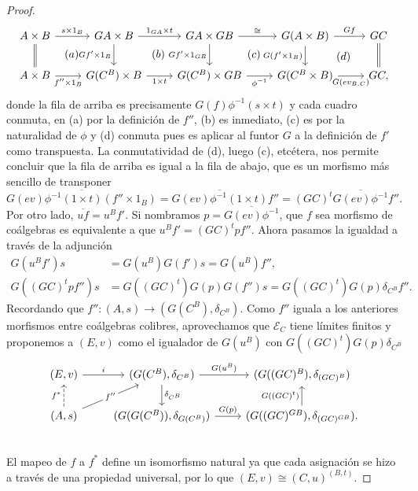 \begin{proof}
  \begin{equation*}
    \begin{tikzcd}
      A\times B\ar[equals]{d}\ar{r}{s\times 1_B}\ar[phantom]{rd}{(a)} & GA\times B\ar[swap]{d}{Gf'\times 1_B}\ar{r}{1_{GA}\times t}\ar[phantom]{rd}{(b)} & GA\times GB\ar[swap]{d}{Gf'\times 1_{GB}}\ar{r}{\cong}\ar[phantom]{rd}{(c)} & G(A\times B)\ar[swap]{d}{G(f'\times 1_B)}\ar{r}{Gf}\ar[phantom]{rd}{(d)} & GC\ar[equals]{d}\\
      A\times B\ar[swap]{r}{f''\times 1_B}              & G(C^B)\times B\ar[swap]{r}{1\times t}                       & G(C^B)\times GB\ar[swap]{r}{\phi^{-1}}                 & G(C^B\times B)\ar[swap]{r}{G(ev_{B,C})}             & GC,
    \end{tikzcd}
  \end{equation*}
  donde la fila de arriba es precisamente $G(f)\phi^{-1}(s\times t)$ y cada cuadro conmuta, en (a) por la definición de $f''$, (b) es inmediato, (c) es por la 
  naturalidad de $\phi$ y (d) conmuta pues es aplicar al funtor $G$ a la definición de $f'$ como 
  transpuesta. La conmutatividad de (d), luego (c), etcétera, nos permite concluir que la fila de
  arriba es igual a la fila de abajo, que es un morfismo más sencillo de transponer
  \begin{equation*}
    \overline{G(ev)\phi^{-1}(1\times t)(f''\times 1_B)} = \overline{G(ev)\phi^{-1}(1\times t)}f'' = (GC)^t\overline{G(ev)\phi^{-1}}f''.
  \end{equation*}
  Por otro lado, $\overline{uf} = u^Bf'$. Si nombramos $p=\overline{G(ev)\phi^{-1}}$, que $f$ sea
  morfismo de coálgebras es equivalente a que $u^Bf' = (GC)^tpf''$. Ahora pasamos la igualdad a
  través de la adjunción
  \begin{align*}
    G(u^Bf')s &= G(u^B)G(f')s = G(u^B)f'', \\
    G((GC)^tpf'')s &= G((GC)^t)G(p)G(f'')s = G((GC)^t)G(p)\delta_{C^B}f''.
  \end{align*}
  Recordando que $f''\colon (A,s)\to (G(C^B),\delta_{C^B})$. Como $f''$ iguala a los anteriores
  morfismos entre coálgebras colibres, aprovechamos que $\mathcal{E}_C$ tiene límites finitos
  y proponemos a $(E,v)$ como el igualador de $G(u^B)$ con $G((GC)^t)G(p)\delta_{C^B}$
  \begin{equation*}
    \begin{tikzcd}
      (E,v)\ar{r}{i} & (G(C^B),\delta_{C^B})\ar{r}{G(u^B)}\ar{d}{\delta_{C^B}} & (G((GC)^B),\delta_{(GC)^B}) \\
      (A,s)\ar[dashed]{u}{f^*}\ar{ru}[description]{f''} & (G(G(C^B)),\delta_{G(C^B)})\ar{r}{G(p)} & (G((GC)^{GB}),\delta_{(GC)^{GB}}).\ar{u}{G((GC)^t)} \\
    \end{tikzcd}
  \end{equation*}
  El mapeo de $f$ a $f^*$ define un isomorfismo natural ya que cada asignación se hizo a través
  de una propiedad universal, por lo que $(E,v)\cong (C,u)^{(B,t)}$.
\end{proof}

